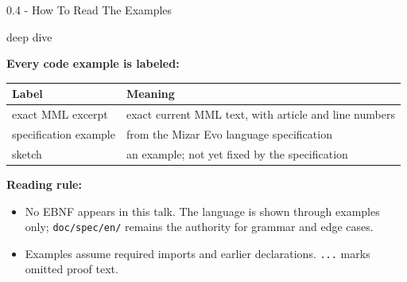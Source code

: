 \documentclass[aspectratio=169,11pt]{beamer}
\newcommand{\deepdivetag}{\hfill\colorbox{black!15}{\textcolor{black!65}{\strut\scriptsize\sffamily deep dive}}}
\begin{document}
\begin{frame}[fragile,t]{0.4 - How To Read The Examples\deepdivetag}
\smallskip
\textbf{Every code example is labeled:}
\begin{footnotesize}
\setlength{\tabcolsep}{3pt}
\renewcommand{\arraystretch}{1.15}
\begin{tabularx}{\textwidth}{>{\raggedright\arraybackslash}X>{\raggedright\arraybackslash}X}
\toprule
\textbf{Label} & \textbf{Meaning} \\
\midrule
exact MML excerpt & exact current MML text, with article and line numbers \\
specification example & from the Mizar Evo language specification \\
sketch & an example; not yet fixed by the specification \\
\bottomrule
\end{tabularx}
\end{footnotesize}

\smallskip
\textbf{Reading rule:}
\begin{itemize}
\setlength{\itemsep}{1pt}
\setlength{\parsep}{0pt}
\setlength{\parskip}{0pt}
\item No EBNF appears in this talk. The language is shown through examples only; \texttt{doc/spec/en/} remains the authority for grammar and edge cases.
\item Examples assume required imports and earlier declarations. \texttt{...} marks omitted proof text.
\end{itemize}
\end{frame}
\end{document}
